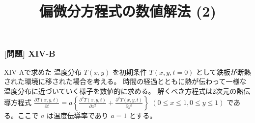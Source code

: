 \documentclass[dvipdfmx,aspectratio=169,20pt]{beamer}
\newcommand{\myfontsetting}[3]{{\fontsize{#1}{#2}\selectfont #3}}
\begin{document}

\title{\myfontsetting{32pt}{32pt}{偏微分方程式の数値解法 (2)}}



\date[\todey]{}

\frame{\titlepage}

\begin{frame}
\frametitle{[問題] X\hspace{-.1em}I\hspace{-.1em}V-B}

\myfontsetting{14pt}{14pt}{
X\hspace{-.1em}I\hspace{-.1em}V-Aで求めた 温度分布 $T(x,y)$ を初期条件 $T(x,y,t=0)$ として鉄板が断熱された環境に移された場合を考える。
時間の経過とともに熱が伝わって一様な温度分布に近づいていく様子を数値的に求める。
解くべき方程式は2次元の熱伝導方程式 $\frac{\partial T(x,y,t)}{\partial t} = a \left\{ \frac{\partial^2 T(x,y,t)}{\partial x^2} + \frac{\partial^2 T(x,y,t)}{\partial y^2}\right\}$ $(0\le x \le 1, 0\le y \le 1)$ である。ここで $a$ は温度伝導率であり $a=1$ とする。
}
\end{frame}
\end{document}
